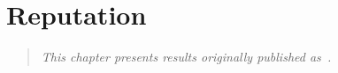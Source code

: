 \chapter{Reputation}
\label{ch:reputation}

\begin{quote}
\textit{This chapter presents results originally
published as~\cite{Adler2007}.}
\end{quote}

\newcommand{\textmass}{\rho_t}
\newcommand{\editmass}{\rho_e} 
\newcommand{\specq}{\alpha}
\newcommand{\especq}{\alpha_e}
\newcommand{\tspecq}{\alpha_t}
\newcommand{\repu}{{\text{\textit{rep}}}}
\def\eqpun{\;}
\newcommand{\prece}{{\text{\textit{prec}}}_e}
\newcommand{\prect}{{\text{\textit{prec}}}_t}
\newcommand{\recall}{{\text{\textit{rec}}}}
\newcommand{\recalle}{{\text{\textit{rec}}}_e}
\newcommand{\recallt}{{\text{\textit{rec}}}_t}
\newcommand{\boost}{{\text{\textit{boost}}}}
\newcommand{\booste}{{\text{\textit{boost}}}_e}
\newcommand{\boostt}{{\text{\textit{boost}}}_t}
\newcommand{\constraint}{\kappa}
\newcommand{\constrainte}{\kappa_e}
\newcommand{\constraintt}{\kappa_t}











